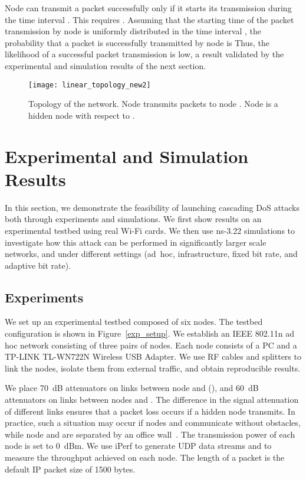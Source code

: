 \documentclass{IEEEtran}
\begin{document}
Node  can transmit a packet successfully only if it starts its transmission during the time interval . This requires . Assuming that the starting time of the packet transmission by node  is uniformly distributed in the time interval , the probability that a packet is successfully transmitted by node   is 
Thus, the likelihood of a successful packet transmission is low, a result validated by the experimental and simulation results of the next section.

 



\begin{figure}[!t]
\centering
\texttt{[image: linear\_topology\_new2]}
\caption{Topology of the network. Node  transmits packets to node . Node  is a hidden node with respect to .}
\label{linear_topology}
\end{figure}



\section{Experimental and Simulation Results}
\label{Simulations and Experiment}
In this section, we demonstrate the feasibility of launching cascading DoS attacks both
through experiments and simulations. We first show results on an experimental testbed using real Wi-Fi cards.
We then use ns-3.22  simulations to investigate how this attack can be performed in significantly larger
scale networks, and under different settings (ad~hoc, infrastructure, fixed bit rate, and adaptive bit rate).

\subsection{Experiments}
\label{Experiment}
 We set up an experimental testbed composed of six nodes. The testbed
 configuration is shown in Figure~\ref{exp_setup}. We establish an
IEEE 802.11n ad hoc network consisting of three pairs of nodes. Each node
consists of a PC and a TP-LINK TL-WN722N Wireless USB Adapter. We use
RF cables and splitters to link the nodes, isolate them from
external traffic, and obtain reproducible results.

We place 70~dB attenuators on links between node  and  (), and 60~dB attenuators
on links between nodes  and . The difference in the
signal attenuation of different links ensures that a packet loss occurs if a hidden node transmits. In practice, such a
situation may occur if nodes  and  communicate without obstacles, while node  and  are separated by an office
wall~\cite{stein1998indoor}.
The transmission power of each node is set to 0~dBm.
We use iPerf
\cite{IPERF} to generate UDP data streams and to measure the throughput achieved on
each node. The length of a packet is the default IP packet size of
1500 bytes.
\end{document}
